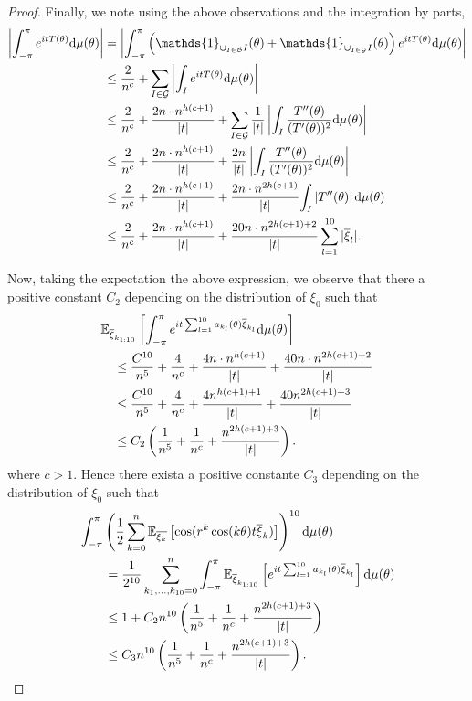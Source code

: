 \documentclass[12pt]{amsart}
\theoremstyle{plain}
\numberwithin{equation}{section}
\newcommand{\<}{\langle}
\renewcommand{\>}{\rangle}
\newcommand{\PP}[1]{\left(#1\right)}
\newcommand{\dd}{\textnormal{d}}
\newcommand{\E}[2][ ]{\mathbb{E}{#1}\left[#2\right]}
\newcommand{\abs}[1]{\left|#1\right|}
\begin{document}
\begin{proof}
Finally, we note using the above observations and the integration by parts,
\begin{align*}
\abs{ \int_{-\pi}^\pi  e^{itT(\theta)} \dd \mu(\theta) } & = \abs{ \int_{-\pi}^\pi  \PP{ \mathds{1}_{ \cup_{I\in\mathcal{B}}I }(\theta) + \mathds{1}_{ \cup_{I\in\mathcal{G}}I }(\theta) }  e^{itT(\theta)} \dd \mu(\theta) } \\
& \leq \frac{2}{n^c} + \sum_{I \in \mathcal{G}} \abs{ \int_{I} e^{itT(\theta)} \dd \mu(\theta) } \\
& \leq \frac{2}{n^c} + \frac{2n \cdot n^{h(c+1)}}{\abs{t}} + \sum_{I \in \mathcal{G}} \frac{1}{\abs{t}} \abs{ \int_{I} \frac{T''(\theta)}{(T'(\theta))^{2}} \dd \mu(\theta)} \\
& \leq \frac{2}{n^c} + \frac{2n \cdot n^{h(c+1)}}{\abs{t}} + \frac{2n}{\abs{t}} \abs{ \int_{I} \frac{T''(\theta)}{(T'(\theta))^{2}} \dd \mu(\theta)} \\
& \leq \frac{2}{n^c} + \frac{2n \cdot n^{h(c+1)}}{\abs{t}} + \frac{2n \cdot n^{2h(c+1)}}{\abs{t}} { \int_{I} \abs{T''(\theta)} \dd \mu(\theta)} \\
& \leq \frac{2}{n^c} + \frac{2n \cdot n^{h(c+1)}}{\abs{t}} + \frac{20 n \cdot n^{2h(c+1) + 2}}{\abs{t}} \sum_{l=1}^{10} |\overline{\xi}_l | . \\
\end{align*}

Now, taking the expectation the above expression, we observe that there a positive constant $C_2$ depending on the distribution of $\xi_0$ such that
\begin{align*}
& \E[_{\overline{\xi}_{k_{1:10}} }]{\int_{-\pi}^{\pi} e^{it\sum_{l=1}^{10} a_{k_l}(\theta) \overline{\xi}_{k_l} } \dd \mu(\theta)} \\
& \quad \leq \frac{C^{10}}{n^{5}} + \frac{4}{n^c} + \frac{4n \cdot n^{h(c+1)}}{\abs{t}} + \frac{40n \cdot n^{2h(c+1) + 2}}{\abs{t}} \\
& \quad \leq \frac{C^{10}}{n^{5}} + \frac{4}{n^c} + \frac{4 n^{h(c+1)+1}}{\abs{t}} + \frac{40 n^{2h(c+1) + 3}}{\abs{t}} \\
& \quad \leq C_2 \PP{\frac{1}{n^{5}} + \frac{1}{n^c} + \frac{n^{2h(c+1) + 3}}{\abs{t}}} .    
\end{align*} 
where $c>1$. Hence there exista a positive constante $C_3$ depending on the distribution of $\xi_0$ such that
\begin{align*}
& \int_{-\pi}^{\pi} \PP{\frac{1}{2}\sum_{k=0}^n\E[_{\overline{\xi_k}}]{\cos(r^k\cos(k\theta)t\overline{\xi}_k) }}^{10} \dd \mu(\theta) \\
&\quad\quad = \frac{1}{2^{10}} \sum_{k_1,\ldots,k_{10}=0}^n \int_{-\pi}^{\pi} \E[_{\overline{\xi}_{k_{1:10}} }]{e^{it\sum_{l=1}^{10} a_{k_l}(\theta) \overline{\xi}_{k_l} }} \dd \mu(\theta) \\
& \quad\quad  \leq 1 + C_2 n^{10} \PP{\frac{1}{n^{5}} + \frac{1}{n^c} + \frac{  n^{2h(c+1) + 3}}{\abs{t}}} \\
& \quad\quad  \leq C_3n^{10} \PP{\frac{1}{n^5} + \frac{1}{n^c} + \frac{ n^{2h(c+1) + 3}}{\abs{t}}}.
\end{align*} 


\end{proof}
\end{document}
